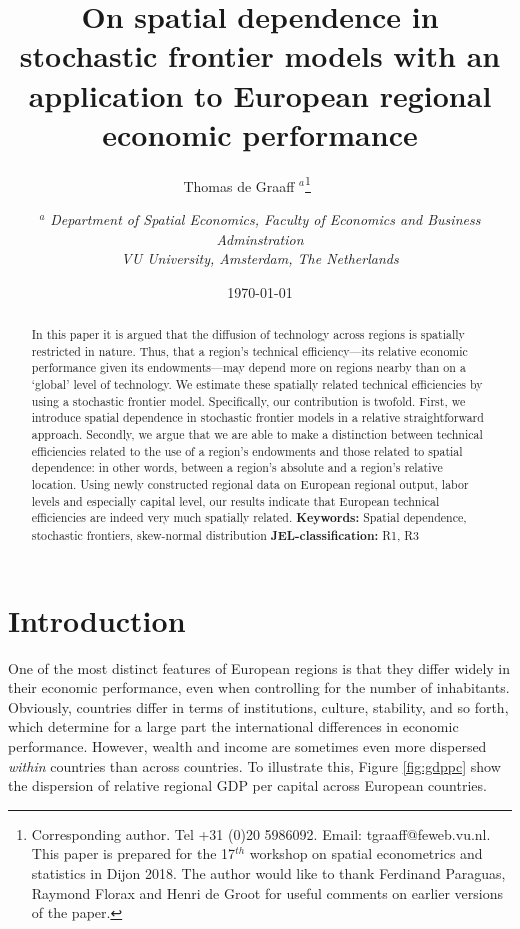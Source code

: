 \documentclass[11pt,parskip,abstracton,notitlepage]{scrartcl}
\begin{document}
%

\title{\bfseries On spatial dependence in stochastic frontier models with an application to European regional economic performance}
\author{Thomas de Graaff $^{a}$\thanks{Corresponding author. Tel +31 (0)20 5986092. Email: tgraaff@feweb.vu.nl. This paper is prepared for the 17$^{th}$ workshop on spatial econometrics and statistics in Dijon 2018. The author would like to thank Ferdinand Paraguas, Raymond Florax and Henri de Groot for useful comments on earlier versions of the paper.} \bigskip \ \ \ 
\and 
{\small {$^{a}$ \emph{Department of Spatial Economics, Faculty of Economics and Business Adminstration}}} \\
{\small {\emph{VU University, Amsterdam, The Netherlands}}} \bigskip \\
}

\date{\today}
\maketitle

\begin{abstract}
\noindent In this paper it is argued that the diffusion of technology across regions is spatially restricted in nature. Thus, that a region's technical efficiency---its relative economic performance given its endowments---may depend more on regions nearby than on a `global' level of technology. We estimate these spatially related technical efficiencies by using a stochastic frontier model. Specifically, our contribution is twofold. First, we introduce spatial dependence in stochastic frontier models in a relative straightforward approach. Secondly, we argue that we are able to make a distinction between technical efficiencies related to the use of a region's endowments and those related to spatial dependence: in other words, between a region's absolute and a region's relative location. Using newly constructed regional data on European regional output, labor levels and especially capital level, our results indicate that European technical efficiencies are indeed very much spatially related.
\noindent 
\newline
\newline
{\small \textbf{Keywords:} Spatial dependence, stochastic frontiers, skew-normal distribution \newline
\textbf{JEL-classification:} R1, R3}
\end{abstract}
\thispagestyle{empty}

\clearpage
\section{Introduction}
%
One of the most distinct features of European regions is that they differ widely in their economic performance, even when controlling for the number of inhabitants. Obviously, countries differ in terms of institutions, culture, stability, and so forth, which determine for a large part the international differences in economic performance. However, wealth and income are sometimes even more dispersed \emph{within} countries than across countries. To illustrate this, Figure \ref{fig:gdppc} show the dispersion of relative regional GDP per capital across European countries.
\end{document}
